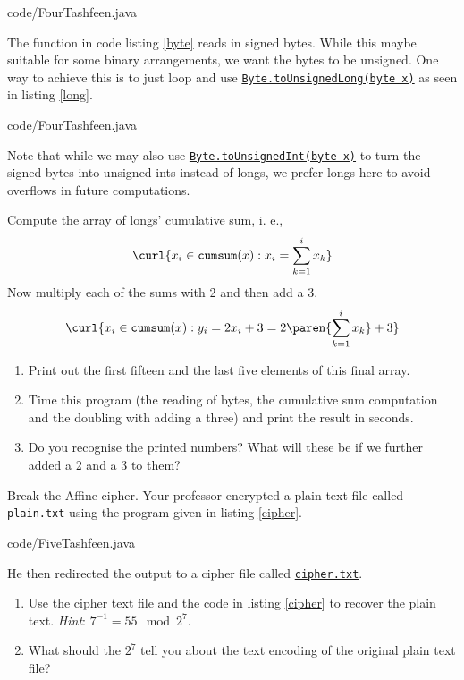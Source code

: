 \documentclass{homework}
\begin{document}

{code/FourTashfeen.java}

The function in code listing \ref{byte} reads in signed bytes. While
this maybe suitable for some binary arrangements, we want the bytes to
be unsigned. One way to achieve this is to just loop and use
\href{https://tinyurl.com/2aw28b6l}{\texttt{Byte.toUnsignedLong(byte x)}}
as seen in listing \ref{long}.


{code/FourTashfeen.java}

Note that while we may also use
\href{https://tinyurl.com/25w2e4wy}{\texttt{Byte.toUnsignedInt(byte x)}}
to turn the signed bytes into unsigned ints instead of longs, we
prefer longs here to avoid overflows in future computations.

Compute the array of longs' cumulative sum, i. e.,
\[
  \curl{x_i \in \mathtt{cumsum}(x) : x_i = \sum_{k=1}^{i} x_k}
\]
Now multiply each of the sums with 2 and then add a 3.
\[
  \curl{x_i \in \mathtt{cumsum}(x) : y_i = 2x_i+3 = 2\paren{\sum_{k=1}^{i} x_k}+3}
\]
\begin{enumerate}
  \item Print out the first fifteen and the last five elements of this final
        array.
  \item Time this program (the reading of bytes, the cumulative sum
        computation and the doubling with adding a three) and print the
        result in seconds.
  \item Do you recognise the printed numbers? What will these be
        if we further added a 2 and a 3 to them?
\end{enumerate}

\question Break the Affine cipher. Your professor encrypted a plain
text file called \texttt{plain.txt} using the program given in listing
\ref{cipher}.


{code/FiveTashfeen.java}

He then redirected the output to a cipher file called
\href{https://tinyurl.com/24pjud2t}{\texttt{cipher.txt}}.

\begin{enumerate}
  \item Use the cipher text file and the code in listing
        \ref{cipher} to recover the plain text. \textit{Hint}: $7^{-1} = 55 \mod 2^7$.
  \item What should the $2^7$ tell you about the text encoding of
        the original plain text file?
\end{enumerate}
\end{document}
